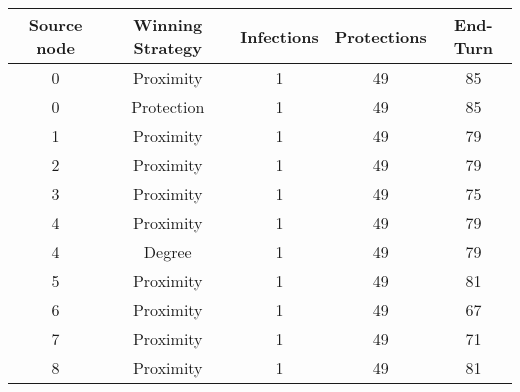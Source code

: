 \documentclass[results.tex]{subfiles}
\begin{document}
    \begin{center}
        \begin{tabular}{| c || c | c | c | c |}
            \hline
            {\bfseries Source node} & {\bfseries Winning Strategy} & {\bfseries Infections} & {\bfseries Protections}
            & {\bfseries End-Turn}
            \\  %
            \hline\hline
            0                       & Proximity                    & 1                      & 49                      & 85                   \\
            \hline
            0                       & Protection                   & 1                      & 49                      & 85                   \\
            \hline
            1                       & Proximity                    & 1                      & 49                      & 79                   \\
            \hline
            2                       & Proximity                    & 1                      & 49                      & 79                   \\
            \hline
            3                       & Proximity                    & 1                      & 49                      & 75                   \\
            \hline
            4                       & Proximity                    & 1                      & 49                      & 79                   \\
            \hline
            4                       & Degree                       & 1                      & 49                      & 79                   \\
            \hline
            5                       & Proximity                    & 1                      & 49                      & 81                   \\
            \hline
            6                       & Proximity                    & 1                      & 49                      & 67                   \\
            \hline
            7                       & Proximity                    & 1                      & 49                      & 71                   \\
            \hline
            8                       & Proximity                    & 1                      & 49                      & 81                   \\

\end{tabular}
\end{center}
\end{document}
